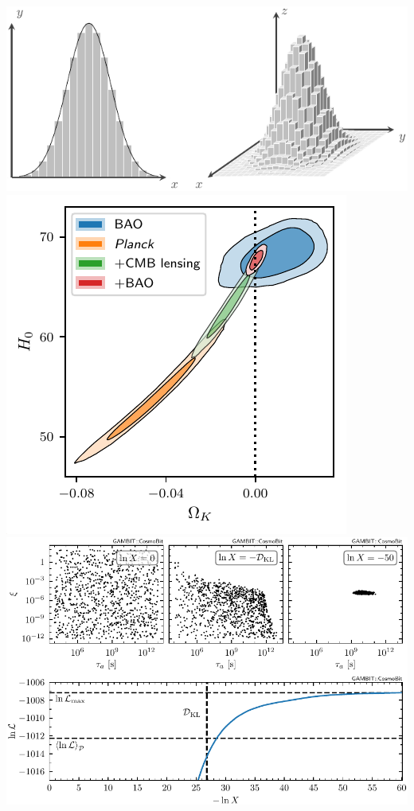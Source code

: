 \documentclass[aspectratio=169]{beamer}
\begin{document}
\begin{frame}
\begin{columns}
    \end{columns}
    \includegraphics[height=0.2\textwidth]{figures/integration}%
    \includegraphics[height=0.2\textwidth]{figures/curvature_3}%
    \includegraphics[height=0.2\textwidth]{figures/ALP_3}%
\end{frame}
\end{document}
